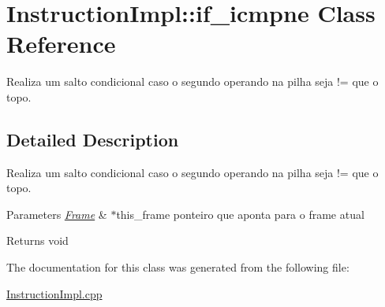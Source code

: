 \hypertarget{class_instruction_impl_1_1if__icmpne}{}\section{Instruction\+Impl\+:\+:if\+\_\+icmpne Class Reference}
\label{class_instruction_impl_1_1if__icmpne}


Realiza um salto condicional caso o segundo operando na pilha seja != que o topo.  




\subsection{Detailed Description}
Realiza um salto condicional caso o segundo operando na pilha seja != que o topo. 


\begin{DoxyParams}{Parameters}
{\em \hyperlink{struct_frame}{Frame}} & $\ast$this\+\_\+frame ponteiro que aponta para o frame atual \\
\hline
\end{DoxyParams}
\begin{DoxyReturn}{Returns}
void 
\end{DoxyReturn}


The documentation for this class was generated from the following file\+:\begin{DoxyCompactItemize}
\item 
\hyperlink{_instruction_impl_8cpp}{Instruction\+Impl.\+cpp}\end{DoxyCompactItemize}
